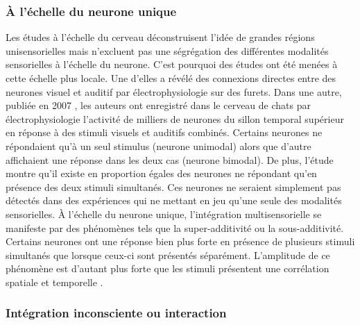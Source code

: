 
\subsubsection{À l'échelle du neurone unique}

Les études à l'échelle du cerveau déconstruisent l'idée de grandes régions unisensorielles mais n'excluent pas une ségrégation des différentes modalités sensorielles à l'échelle du neurone. C'est pourquoi des études ont été menées à cette échelle plus locale. Une d'elles a révélé des connexions directes entre des neurones visuel et auditif \cite{bizley_physiological_2007} par électrophysiologie sur des furets. Dans une autre, publiée en 2007 \cite{allman_multisensory_2007}, les auteurs ont enregistré dans le cerveau de chats par électrophysiologie l'activité de milliers de neurones du sillon temporal supérieur en réponse à des stimuli visuels et auditifs combinés. Certains neurones ne répondaient qu'à un seul stimulus (neurone unimodal) alors que d'autre affichaient une réponse dans les deux cas (neurone bimodal). De plus, l'étude montre qu'il existe en proportion égales des neurones ne répondant qu'en présence des deux stimuli simultanés. Ces neurones ne seraient simplement pas détectés dans des expériences qui ne mettant en jeu qu'une seule des modalités sensorielles. À l'échelle du neurone unique, l'intégration multisensorielle se manifeste par des phénomènes tels que la super-additivité ou la sous-additivité. Certains neurones ont une réponse bien plus forte en présence de plusieurs stimuli simultanés que lorsque ceux-ci sont présentés séparément. L'amplitude de ce phénomène est d'autant plus forte que les stimuli présentent une corrélation spatiale et temporelle \cite{stein_multisensory_2008}. 


\subsubsection{Intégration inconsciente ou interaction}

